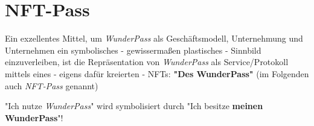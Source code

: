 
\section{NFT-Pass}
\label{sec:nft-pass}

Ein exzellentes Mittel, um \textit{WunderPass} als Geschäftsmodell, Unternehmung und Unternehmen ein symbolisches - gewissermaßen plastisches - Sinnbild einzuverleiben, ist die Repräsentation von \textit{WunderPass} als Service/Protokoll mittels eines - eigens dafür kreierten - NFTs: \textbf{"Des WunderPass"} (im Folgenden auch \textit{NFT-Pass} genannt)

\vspace{0.3cm}

\begin{Fazit}

"Ich nutze \textit{WunderPass}" wird symbolisiert durch "Ich besitze \textbf{meinen WunderPass}"!

\end{Fazit}

\vspace{0.3cm}


\vspace{0.5cm}